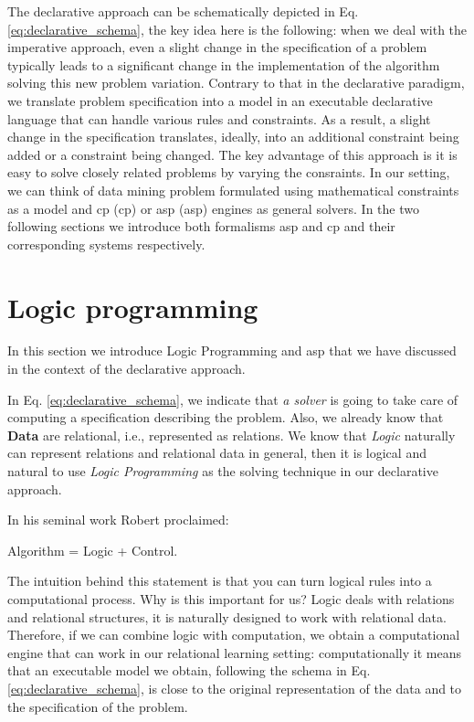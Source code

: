 \pubrev


The declarative approach can be schematically depicted in Eq.
\ref{eq:declarative_schema}, the key idea here is the following: when
we deal with the imperative approach, even a slight change in the
specification of a problem typically leads to a significant change in
the implementation of the algorithm solving this new problem
variation. Contrary to that in the declarative paradigm, we translate
problem specification into a model in an executable declarative language that can
handle various rules and constraints. As a result, a slight change in
the specification translates, ideally, into an additional constraint
being added or a constraint being changed. The key advantage of this
approach is it is easy to solve  closely related problems by varying
the consraints. In our setting, we can think of data
mining problem formulated using mathematical constraints as a
model and \acrlong{cp} (\acrshort{cp}) or \acrlong{asp}
(\acrshort{asp}) engines
as general solvers. In the two following sections we introduce both
formalisms \acrshort{asp} and \acrshort{cp} and their corresponding systems respectively.



\section{Logic programming}\label{sec:logic_programming}
In this section we introduce Logic Programming and \acrlong{asp} that
we have discussed in the context of the declarative approach.


\pubrev
In Eq. \ref{eq:declarative_schema}, we indicate that \textit{a solver}
is going to take care of computing a specification describing the
problem. Also, we already know that \textbf{Data} are relational, i.e., represented as relations. We know that \textit{Logic} naturally can represent relations and relational data in general, then it is logical and natural to use \textit{Logic Programming} as the solving technique in our declarative approach.
\pubrev

In his seminal work Robert \textcite{kowalski} proclaimed:
\begin{center}
  Algorithm = Logic + Control.
\end{center}

The intuition behind this statement is that
you can turn logical rules into a computational process. 
Why is this important for us? Logic deals with
relations and relational structures, it is naturally designed to
work with relational data. Therefore, if we can combine logic
with computation, we obtain a computational engine that can work in
\pubrev
our relational learning setting: computationally it means that an
executable model we obtain, following the schema in Eq. \ref{eq:declarative_schema}, is close to the original representation of the data and to the specification of the problem.

